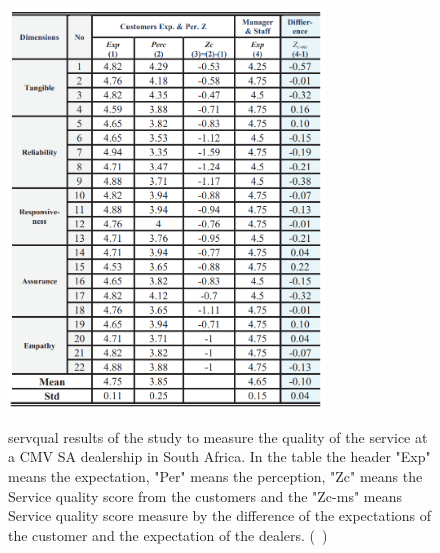 \begin{figure}[htbp]
  \caption{\ac{servqual} results of the study to measure the quality of the service at a CMV SA dealership in South Africa. In the table the header "Exp" means the expectation, "Per" means the perception, "Zc" means the Service quality score from the customers and the "Zc-ms" means Service quality score measure by the difference of the expectations of the customer and the expectation of the dealers. (~\cite{Measuring_After_sales_Service_Quality})}
  \centering
  \includegraphics[width=0.75\textwidth]{figs/SERVQUAL_results}
  \label{fig:SERVQUAL_results}
\end{figure}

